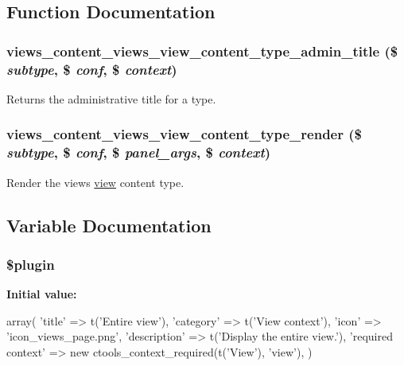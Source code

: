 \subsection{Function Documentation}
\hypertarget{views__view_8inc_a6bee99a3c0e1579869362a62deeae961}{
\subsubsection[{views\_\-content\_\-views\_\-view\_\-content\_\-type\_\-admin\_\-title}]{\setlength{\rightskip}{0pt plus 5cm}views\_\-content\_\-views\_\-view\_\-content\_\-type\_\-admin\_\-title (\$ {\em subtype}, \/  \$ {\em conf}, \/  \$ {\em context})}}
\label{views__view_8inc_a6bee99a3c0e1579869362a62deeae961}
Returns the administrative title for a type. \hypertarget{views__view_8inc_a57e0e0e5cb37e1d7e9886514356188f3}{
\subsubsection[{views\_\-content\_\-views\_\-view\_\-content\_\-type\_\-render}]{\setlength{\rightskip}{0pt plus 5cm}views\_\-content\_\-views\_\-view\_\-content\_\-type\_\-render (\$ {\em subtype}, \/  \$ {\em conf}, \/  \$ {\em panel\_\-args}, \/  \$ {\em context})}}
\label{views__view_8inc_a57e0e0e5cb37e1d7e9886514356188f3}
Render the views \hyperlink{classview}{view} content type. 

\subsection{Variable Documentation}
\hypertarget{views__view_8inc_ada8a7130088351710bb02ed622d6bf65}{
\subsubsection[{\$plugin}]{\setlength{\rightskip}{0pt plus 5cm}\$plugin}}
\label{views__view_8inc_ada8a7130088351710bb02ed622d6bf65}
{\bfseries Initial value:}
\begin{DoxyCode}
 array(
  'title' => t('Entire view'),
  'category' => t('View context'),
  'icon' => 'icon_views_page.png',
  'description' => t('Display the entire view.'),
  'required context' => new ctools_context_required(t('View'), 'view'),
)
\end{DoxyCode}
